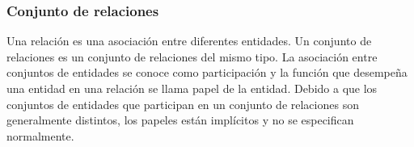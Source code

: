 	\subsubsection{Conjunto de relaciones}
		\par \noindent
			Una relación es una asociación entre diferentes entidades. Un conjunto de relaciones es un conjunto de relaciones del mismo tipo. La asociación entre conjuntos de entidades se conoce como participación y la función que desempeña una entidad en una relación se llama papel de la entidad.
			Debido a que los conjuntos de entidades que participan en un conjunto de relaciones son generalmente distintos, los papeles están implícitos y no se especifican
			normalmente.
			
\clearpage
\thispagestyle{plain}